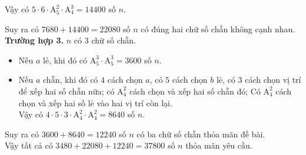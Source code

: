 \begin{vd}
{\begin{itemize}
			Vậy có $5\cdot 6\cdot \mathrm{A}_5^2 \cdot \mathrm{A}_4^3 =14400$ số $n$.
		\end{itemize}
		Suy ra có $7680+14400=22080$ số $n$ có đúng hai chữ số chẵn không cạnh nhau.\\
		\textbf{\color{blue} Trường hợp 3.} $n$ có $3$ chữ số chẵn.
		\begin{itemize}
			\item Nếu $a$ lẻ, khi đó có $\mathrm{A}_5^3 \cdot \mathrm{A}_5^3 =3600$ số $n$.
			\item Nếu $a$ chẵn, khi đó có $4$ cách chọn $a$, có $5$ cách chọn $b$ lẻ, có $3$ cách chọn vị trí để xếp hai số chẵn nữa; có $\mathrm{A}_4^2$ cách chọn và xếp hai số chẵn đó; Có $\mathrm{A}_4^2$ cách chọn và xếp hai số lẻ vào hai vị trí còn lại.\\
			Vậy có $4\cdot 5 \cdot 3 \cdot \mathrm{A}_4^2 \cdot \mathrm{A}_4^2 =8640$ số $n$.
		\end{itemize}
		Suy ra có $3600+8640=12240$ số $n$ có ba chữ số chẵn thỏa mãn đề bài.\\
		Vậy tất cả có $3480+22080+12240=37800$ số $n$ thỏa mãn yêu cầu.
	}
\end{vd}
